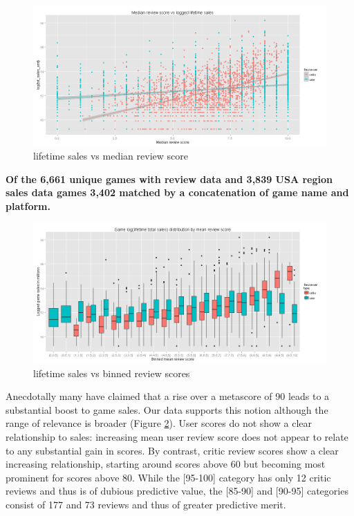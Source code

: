 \documentclass[letterpaper]{article}
\begin{document}
\begin{figure}[tbph]
\centering
\includegraphics[width=\linewidth]{./sales_total_vs_medianscore}
\caption{lifetime sales vs median review score}
\label{fig:lifesale_revscore}
\end{figure}



\textbf{Of the 6,661 unique games with review data and 3,839 USA region sales data games 3,402 matched by a concatenation of game name and platform.}

\begin{figure}[tbph]
\centering
\includegraphics[width=\linewidth]{./sales_total_vs_scorebin}
\caption{lifetime sales vs binned review scores}
\label{fig:lifesale_revscore_boxplot}
\end{figure}


Anecdotally many have claimed that a rise over a metascore of 90 leads to a substantial boost to game sales. Our data supports this notion although the range of relevance is broader (Figure \ref{fig:lifesale_revscore_boxplot}). User scores do not show a clear relationship to sales: increasing mean user review score does not appear to relate to any substantial gain in scores. By contrast, critic review scores show a clear increasing relationship, starting around scores above 60 but becoming most prominent for scores above 80. While the [95-100] category has only 12 critic reviews and thus is of dubious predictive value, the [85-90] and [90-95] categories consist of 177 and 73 reviews and thus of greater predictive merit.
\end{document}
